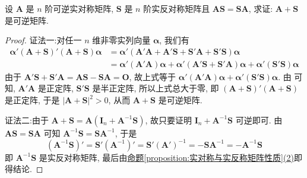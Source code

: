 \documentclass[../../main.tex]{subfiles}
\begin{document}
\begin{proposition}\label{proposition:可逆实对称与实反称阵可交换则相加也可逆}
设 \(\boldsymbol{A}\) 是 \(n\) 阶可逆实对称矩阵, \(\boldsymbol{S}\) 是 \(n\) 阶实反对称矩阵且 \(\boldsymbol{A}\boldsymbol{S}=\boldsymbol{S}\boldsymbol{A}\), 求证: \(\boldsymbol{A}+\boldsymbol{S}\) 是可逆矩阵.
\end{proposition}
\begin{proof}
{\color{blue}证法一:}对任一 \(n\) 维非零实列向量 \(\boldsymbol{\alpha}\), 我们有
\begin{align*}
\boldsymbol{\alpha}'(\boldsymbol{A}+\boldsymbol{S})'(\boldsymbol{A}+\boldsymbol{S})\boldsymbol{\alpha}&=\boldsymbol{\alpha}'(\boldsymbol{A}'\boldsymbol{A}+\boldsymbol{A}'\boldsymbol{S}+\boldsymbol{S}'\boldsymbol{A}+\boldsymbol{S}'\boldsymbol{S})\boldsymbol{\alpha}\\
&=\boldsymbol{\alpha}'(\boldsymbol{A}'\boldsymbol{A})\boldsymbol{\alpha}+\boldsymbol{\alpha}'(\boldsymbol{A}'\boldsymbol{S}+\boldsymbol{S}'\boldsymbol{A})\boldsymbol{\alpha}+\boldsymbol{\alpha}'(\boldsymbol{S}'\boldsymbol{S})\boldsymbol{\alpha}
\end{align*}
由于 \(\boldsymbol{A}'\boldsymbol{S}+\boldsymbol{S}'\boldsymbol{A}=\boldsymbol{A}\boldsymbol{S}-\boldsymbol{S}\boldsymbol{A}=\boldsymbol{O}\), 故上式等于 \(\boldsymbol{\alpha}'(\boldsymbol{A}'\boldsymbol{A})\boldsymbol{\alpha}+\boldsymbol{\alpha}'(\boldsymbol{S}'\boldsymbol{S})\boldsymbol{\alpha}\). 由 可知, \(\boldsymbol{A}'\boldsymbol{A}\) 是正定阵, \(\boldsymbol{S}'\boldsymbol{S}\) 是半正定阵, 所以上式总大于零, 即 \((\boldsymbol{A}+\boldsymbol{S})'(\boldsymbol{A}+\boldsymbol{S})\) 是正定阵, 于是 \(|\boldsymbol{A}+\boldsymbol{S}|^2>0\), 从而 \(\boldsymbol{A}+\boldsymbol{S}\) 是可逆矩阵.

{\color{blue}证法二:}由于 \(\boldsymbol{A}+\boldsymbol{S}=\boldsymbol{A}(\boldsymbol{I}_n+\boldsymbol{A}^{-1}\boldsymbol{S})\), 故只要证明 \(\boldsymbol{I}_n+\boldsymbol{A}^{-1}\boldsymbol{S}\) 可逆即可. 由 \(\boldsymbol{A}\boldsymbol{S}=\boldsymbol{S}\boldsymbol{A}\) 可知 \(\boldsymbol{A}^{-1}\boldsymbol{S}=\boldsymbol{S}\boldsymbol{A}^{-1}\), 于是
\[
(\boldsymbol{A}^{-1}\boldsymbol{S})'=\boldsymbol{S}'(\boldsymbol{A}^{-1})'=\boldsymbol{S}'(\boldsymbol{A}')^{-1}=-\boldsymbol{S}\boldsymbol{A}^{-1}=-\boldsymbol{A}^{-1}\boldsymbol{S}
\]
即 \(\boldsymbol{A}^{-1}\boldsymbol{S}\) 是实反对称矩阵, 最后由\hyperref[proposition:实对称与实反称矩阵性质]{命题\ref{proposition:实对称与实反称矩阵性质}(2)}即得结论.

\end{proof}
\end{document}

